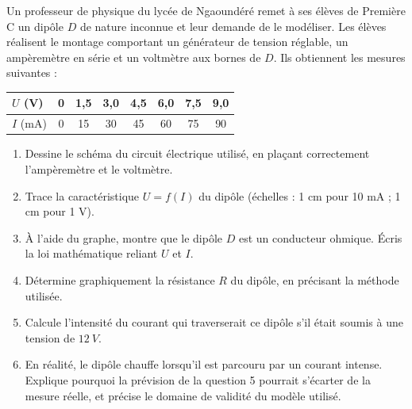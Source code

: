 \documentclass[11pt]{article}
\begin{document}
\begin{exercice}
Un professeur de physique du lycée de Ngaoundéré remet à ses élèves de Première C un dipôle $D$ de nature inconnue et leur demande de le modéliser. Les élèves réalisent le montage comportant un générateur de tension réglable, un ampèremètre en série et un voltmètre aux bornes de $D$. Ils obtiennent les mesures suivantes :
\begin{center}
\begin{tabular}{|l|*{7}{c|}}\hline
$U$ (V) & 0 & 1,5 & 3,0 & 4,5 & 6,0 & 7,5 & 9,0 \\ \hline
$I$ (mA) & 0 & 15 & 30 & 45 & 60 & 75 & 90 \\ \hline
\end{tabular}
\end{center}
\begin{enumerate}
\item Dessine le schéma du circuit électrique utilisé, en plaçant correctement l'ampèremètre et le voltmètre.
\item Trace la caractéristique $U = f(I)$ du dipôle (échelles : 1 cm pour 10 mA ; 1 cm pour 1 V).
\item À l'aide du graphe, montre que le dipôle $D$ est un conducteur ohmique. Écris la loi mathématique reliant $U$ et $I$.
\item Détermine graphiquement la résistance $R$ du dipôle, en précisant la méthode utilisée.
\item Calcule l'intensité du courant qui traverserait ce dipôle s'il était soumis à une tension de $\SI{12}{V}$.
\item En réalité, le dipôle chauffe lorsqu'il est parcouru par un courant intense. Explique pourquoi la prévision de la question 5 pourrait s'écarter de la mesure réelle, et précise le domaine de validité du modèle utilisé.
\end{enumerate}
\end{exercice}
\end{document}
